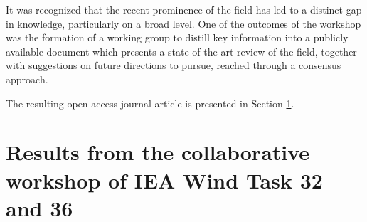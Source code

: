 It was recognized that the recent prominence of the field has led to a distinct gap in knowledge, particularly on a broad level. One of the outcomes of the workshop was the formation of a working group to distill key information into a publicly available document which presents a state of the art review of the field, together with suggestions on future directions to pursue, reached through a consensus approach.

The resulting open access journal article is presented in Section \ref{sec:IEA_paper}.


\clearpage
\section{Results from the collaborative workshop of IEA Wind Task 32 and 36}
\label{sec:IEA_paper}
%
